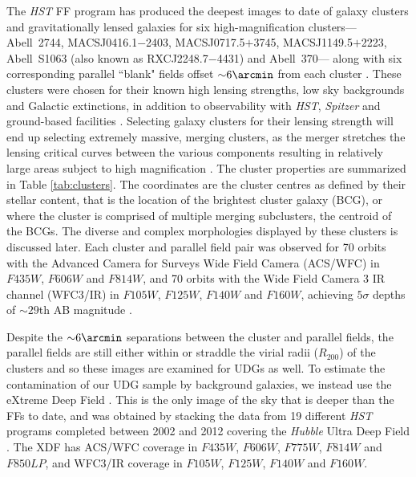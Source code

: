 \documentclass[iop,tighten,twocolumn,apj,floatfix]{emulateapj}
\begin{document}
The \textit{HST} FF program has produced the deepest images to date of galaxy
clusters and gravitationally lensed galaxies for six high-magnification
clusters---
Abell~2744, MACSJ0416.1$-$2403, MACSJ0717.5$+$3745, MACSJ1149.5$+$2223,
Abell~S1063 (also known as RXCJ2248.7$-$4431) and Abell~370---
along with six corresponding parallel ``blank" fields offset
${\sim}6\arcmin$ from each cluster \citep{lotz2017}.
These clusters were chosen for their known high lensing strengths, low sky
backgrounds and Galactic extinctions, in addition to observability with
\textit{HST}, \textit{Spitzer} and ground-based facilities \citep{lotz2017}.
Selecting galaxy clusters for their lensing strength will end up selecting
extremely massive, merging clusters, as the merger stretches the lensing
critical curves between the various components resulting in relatively large
areas subject to high magnification \citep{redlich2012, diego2016}.
The cluster properties are summarized in Table \ref{tab:clusters}.
The coordinates are the cluster centres as defined by their stellar content,
that is the location of the brightest cluster galaxy (BCG), or where the
cluster is comprised of multiple merging subclusters, the centroid of the BCGs.
The diverse and complex morphologies displayed by these clusters is discussed
later.
Each cluster and parallel field pair was observed for 70 orbits with the
Advanced Camera for Surveys Wide Field Camera (ACS/WFC) in $F435W$, $F606W$
and $F814W$, and 70 orbits with the Wide Field Camera 3 IR channel (WFC3/IR)
in $F105W$, $F125W$, $F140W$ and $F160W$, achieving $5\sigma$ depths of
${\sim}29$th AB magnitude \citep{lotz2017}.

Despite the ${\sim}6\arcmin$ separations between the cluster and parallel fields,
the parallel fields are still either within or straddle the virial radii
($R_{200}$) of the clusters and so these images are examined for UDGs as well.
To estimate the contamination of our UDG sample by background galaxies, we
instead use the eXtreme Deep Field \citep[XDF,][]{illingworth2013}.
This is the only image of the sky that is deeper than the FFs to date, and
was obtained by stacking the data from 19 different \textit{HST} programs
completed between 2002 and 2012 covering the \textit{Hubble} Ultra Deep Field
\citep{illingworth2013}.
The XDF has ACS/WFC coverage in $F435W$, $F606W$, $F775W$, $F814W$ and $F850LP$,
and WFC3/IR coverage in $F105W$, $F125W$, $F140W$ and $F160W$.
\end{document}
